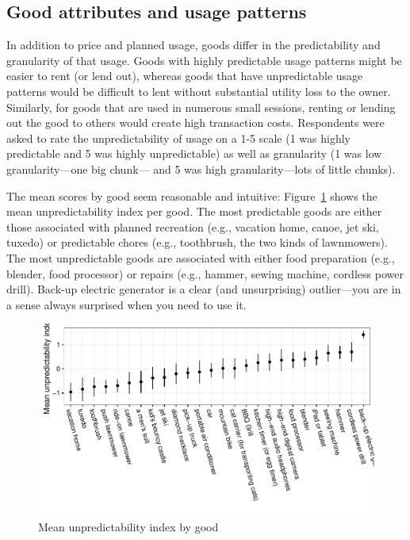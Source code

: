 \documentclass[11pt]{article}
\begin{document}
\subsection{Good attributes and usage patterns} 
In addition to price and planned usage, goods differ in the predictability and granularity of that usage.
Goods with highly predictable usage patterns might be easier to rent (or lend out), whereas goods that have unpredictable usage patterns would be difficult to lent without substantial utility loss to the owner.
Similarly, for goods that are used in numerous small sessions, renting
or lending out the good to others would create high transaction costs.
Respondents were asked to rate the unpredictability of usage on a 1-5 scale (1 was highly predictable and 5 was highly unpredictable) as well as granularity (1 was low granularity---one big chunk--- and 5 was high granularity---lots of little chunks).  

The mean scores by good seem reasonable and intuitive: 
Figure~\ref{fig:predict_index} shows the mean unpredictability index per good. 
The most predictable goods are either those associated with planned recreation (e.g., vacation home, canoe, jet ski, tuxedo) or predictable chores (e.g., toothbrush, the two kinds of lawnmowers). 
The most unpredictable goods are associated with either food preparation (e.g., blender, food processor) or repairs (e.g., hammer, sewing machine, cordless power drill). 
Back-up electric generator is a clear (and unsurprising) outlier---you are in a sense always surprised when you need to use it. 

\begin{figure}
\centering 
\caption{Mean unpredictability index by good \label{fig:predict_index} }
\begin{minipage}{0.90 \linewidth}
\includegraphics[width = \linewidth]{./plots/predictability.pdf} 
\end{minipage} 
\end{figure} 
\end{document}
